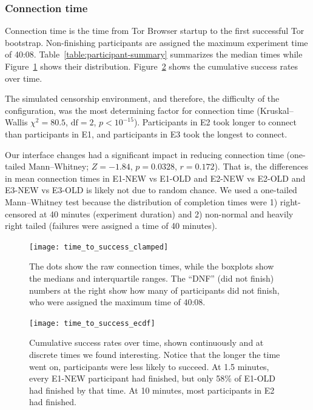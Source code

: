 \documentclass[USenglish,oneside,twocolumn]{article}
\begin{document}
\subsubsection{Connection time} 
Connection time is the time from Tor Browser startup to the first successful Tor bootstrap. Non-finishing participants are assigned the maximum experiment time of 40:08. Table~\ref{table:participant-summary} summarizes the median times while Figure~\ref{fig:time_to_success_clamped} shows their distribution. Figure~\ref{fig:time_to_success_ecdf} shows the cumulative success rates over time. 

The simulated censorship environment, and therefore, the difficulty of the configuration, was the most determining factor for connection time (Kruskal--Wallis $\chi^2 = 80.5$, $\mbox{df} = 2$, $p < 10^{-15}$). Participants in E2 took longer to connect than participants in E1, and participants in E3 took the longest to connect.

Our interface changes had a significant impact in reducing connection time (one-tailed Mann--Whitney; $ Z = -1.84$, $p = 0.0328$, $r= 0.172$). That is, the differences in mean connection times in E1-NEW vs E1-OLD and E2-NEW vs E2-OLD and E3-NEW vs E3-OLD is likely not due to random chance. We used a one-tailed Mann--Whitney test because the distribution of completion times were 1) right-censored at 40 minutes (experiment duration) and 2) non-normal and heavily right tailed (failures were assigned a time of 40 minutes). 

\begin{figure}[t]
\centering
\texttt{[image: time\_to\_success\_clamped]}
\caption{
The dots show the raw connection times,
while the boxplots show the medians and interquartile ranges.
The ``DNF'' (did not finish) numbers at the right show how many of participants 
did not finish, who were assigned the maximum time of 40:08.
}
\label{fig:time_to_success_clamped}
\end{figure}

\begin{figure}[t]
\centering
\texttt{[image: time\_to\_success\_ecdf]}

\caption{
Cumulative success rates over time, shown continuously and at discrete times we found interesting.
Notice that the longer the time went on, participants were less likely to succeed. 
At 1.5 minutes, every E1-NEW participant had finished,
but only 58\% of E1-OLD had finished by that time.  
At 10 minutes, most participants in E2 had finished. 
}
\label{fig:time_to_success_ecdf}
\end{figure}
\end{document}
